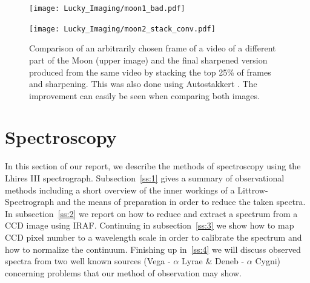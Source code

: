 \documentclass{article}
\begin{document}
\begin{figure}[H]
\centering
\begin{minipage}{1.\textwidth}
\centering
  \texttt{[image: Lucky\_Imaging/moon1\_bad.pdf]}
\end{minipage}
\begin{minipage}{1.\textwidth}
\centering
  \texttt{[image: Lucky\_Imaging/moon2\_stack\_conv.pdf]}
\end{minipage}
    \caption{Comparison of an arbitrarily chosen frame of a video of a different part of the Moon (upper image) and the final sharpened version produced from the same video by stacking the top 25\% of frames and sharpening. This was also done using Autostakkert \parencite{autostakkert}. The improvement can easily be seen when comparing both images.}
    \label{fig:moon_comp_av}
\end{figure}

\section{Spectroscopy}\label{sec:spectrum}
In this section of our report, we describe the methods of spectroscopy using the Lhires III spectrograph. Subsection~\ref{ss:1} gives a summary of observational methods including a short overview of the inner workings of a Littrow-Spectrograph and the means of preparation in order to reduce the taken spectra. In subsection~\ref{ss:2} we report on how to reduce and extract a spectrum from a CCD image using IRAF. Continuing in subsection~\ref{ss:3} we show how to map CCD pixel number to a wavelength scale in order to calibrate the spectrum and how to normalize the continuum. Finishing up in~\ref{ss:4} we will discuss observed spectra from two well known sources (Vega - $\alpha$ Lyrae  $\&$ Deneb - $\alpha$ Cygni) concerning problems that our method of observation may show. 
\end{document}
